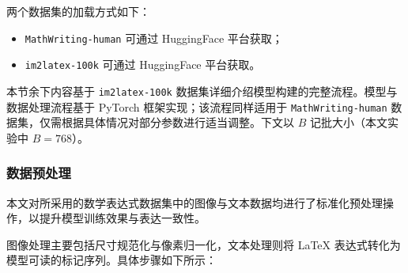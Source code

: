 两个数据集的加载方式如下：
\begin{itemize}
    \item \texttt{MathWriting-human} 可通过 HuggingFace 平台获取\footnotemark[1]；
    \item \texttt{im2latex-100k} 可通过 HuggingFace 平台获取\footnotemark[2]。
\end{itemize}


本节余下内容基于 \texttt{im2latex-100k} 数据集详细介绍模型构建的完整流程。模型与数据处理流程基于 PyTorch 框架实现；该流程同样适用于 \texttt{MathWriting-human} 数据集，仅需根据具体情况对部分参数进行适当调整。下文以 $B$ 记批大小（本文实验中 $B=768$）。
\subsubsection{数据预处理}
本文对所采用的数学表达式数据集中的图像与文本数据均进行了标准化预处理操作，以提升模型训练效果与表达一致性。

图像处理主要包括尺寸规范化与像素归一化，文本处理则将 LaTeX 表达式转化为模型可读的标记序列。具体步骤如下所示：

